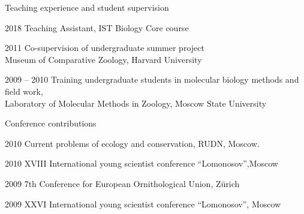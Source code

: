 \documentclass[10pt]{article}
\begin{document}
\begin{cv}
\newpage


\begin{cvlist}{Teaching experience and student supervision}
\item[2018] Teaching Assistant, IST Biology Core course
\item[2011] Co-supervision of undergraduate summer project \\
Museum of Comparative Zoology, Harvard University 
\item[2009 -- 2010] Training undergraduate students in molecular biology methods and field work,\\ Laboratory of Molecular Methods in Zoology, Moscow State University
\end{cvlist}

\begin{cvlist}{Conference contributions} %
 \item[2010] Current problems of ecology and conservation, RUDN, {Moscow}.
\item[2010]  XVIII International young scientist conference ``Lomonosov'',{Moscow}
\item[2009]  7th Conference for European Ornithological Union, {Z\"urich}
\item[2009] XXVI International  young scientist conference ``Lomonosov'', {Moscow}

\end{cvlist}


\end{cv}
\end{document}
